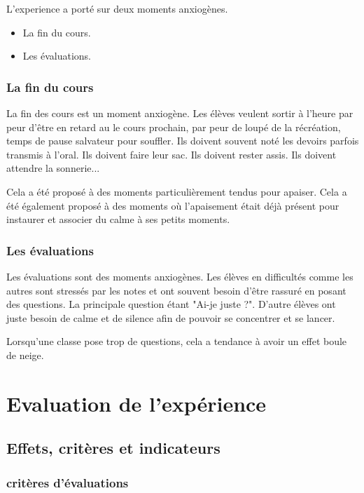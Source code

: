 \documentclass[11pt]{article}
\begin{document}
	L'experience a porté sur deux moments anxiogènes. 
	
	\begin{itemize}
	\item La fin du cours.  
	\item Les évaluations.
	\end{itemize}
	
	\subsubsection{La fin du cours}
	
	La fin des cours est un moment anxiogène. Les élèves veulent sortir à l'heure par peur d'être en retard au le cours prochain, par peur de loupé de la récréation, temps de pause salvateur pour souffler. Ils doivent souvent noté les devoirs parfois transmis à l'oral. Ils doivent faire leur sac. Ils doivent rester assis. Ils doivent attendre la sonnerie...
	
	Cela a été proposé à des moments particulièrement tendus pour apaiser. Cela a été également proposé à des moments où l'apaisement était déjà présent pour instaurer et associer du calme à ses petits moments.
	
	\subsubsection{Les évaluations}
	
	Les évaluations sont des moments anxiogènes. Les élèves en difficultés comme les autres sont stressés par les notes et ont souvent besoin d'être rassuré en posant des questions. La principale question étant "Ai-je juste ?". D'autre élèves ont juste besoin de calme et de silence afin de pouvoir se concentrer et se lancer.
	
	Lorsqu'une classe pose trop de questions, cela a tendance à avoir un effet boule de neige. 
	
	\newpage
	
	\section{Evaluation de l'expérience}
	
	\subsection{Effets, critères et indicateurs}
	
	\subsubsection{critères d'évaluations}
	
\end{document}
